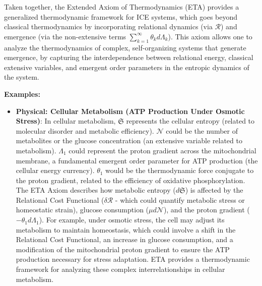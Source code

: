 \documentclass{article}
\begin{document}
Taken together, the Extended Axiom of Thermodynamics (ETA) provides a generalized thermodynamic framework for ICE systems, which goes beyond classical thermodynamics by incorporating relational dynamics (via $\mathcal{R}$) and emergence (via the non-extensive terms $\sum_{k=1}^\infty \theta_k d\Lambda_k$). This axiom allows one to analyze the thermodynamics of complex, self-organizing systems that generate emergence, by capturing the interdependence between relational energy, classical extensive variables, and emergent order parameters in the entropic dynamics of the system.

\textbf{Examples:}
\begin{itemize}
\item \textbf{Physical: Cellular Metabolism (ATP Production Under Osmotic Stress)}: In cellular metabolism, $\mathfrak{S}$ represents the cellular entropy (related to molecular disorder and metabolic efficiency). $\mathcal{N}$ could be the number of metabolites or the glucose concentration (an extensive variable related to metabolism). $\Lambda_1$ could represent the proton gradient across the mitochondrial membrane, a fundamental emergent order parameter for ATP production (the cellular energy currency). $\theta_1$ would be the thermodynamic force conjugate to the proton gradient, related to the efficiency of oxidative phosphorylation. The ETA Axiom describes how metabolic entropy ($d\mathfrak{S}$) is affected by the Relational Cost Functional ($\delta\mathcal{R}$ - which could quantify metabolic stress or homeostatic strain), glucose consumption ($\mu d\mathcal{N}$), and the proton gradient ($-\theta_1 d\Lambda_1$). For example, under osmotic stress, the cell may adjust its metabolism to maintain homeostasis, which could involve a shift in the Relational Cost Functional, an increase in glucose consumption, and a modification of the mitochondrial proton gradient to ensure the ATP production necessary for stress adaptation. ETA provides a thermodynamic framework for analyzing these complex interrelationships in cellular metabolism.

\end{itemize}
\end{document}
